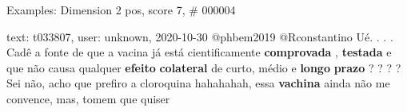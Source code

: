 \begin{frame}{Examples: Dimension 2 pos, score 7, \# 000004}
\footnotesize
\begin{exampleblock}{text: t033807, user: unknown, 2020-10-30}
@phbem2019 @Rconstantino Ué. . . . Cadê a fonte de que a vacina já está 
cientificamente \textbf{comprovada} , \textbf{testada} e que não causa qualquer 
\textbf{efeito} \textbf{colateral} de curto, médio e \textbf{longo} 
\textbf{prazo} ? ? ? ? Sei não, acho que prefiro a cloroquina hahahahah, essa 
\textbf{vachina} ainda não me convence, mas, tomem que quiser 
\end{exampleblock}
\end{frame}
